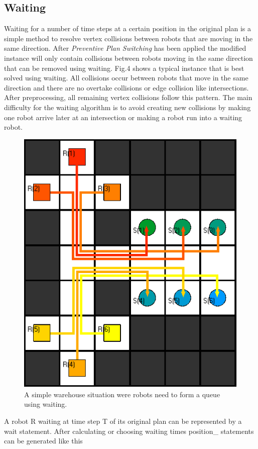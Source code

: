 \documentclass{llncs}
\begin{document}
\subsection{Waiting}
Waiting for a number of time steps at a certain position in the original plan is a simple method to resolve vertex collisions between robots that are moving in the same direction. After \emph{Preventive Plan Switching} has been applied the modified instance will only contain collisions between robots moving in the same direction that can be removed using waiting. 
Fig.4 shows a typical instance that is best solved using waiting. All collisions occur between robots that move in the same direction and there are no overtake collisions or edge collision like intersections.
After preprocessing, all remaining vertex collisions follow this pattern. The main difficulty for the waiting algorithm is to avoid creating new collisions by making one robot arrive later at an intersection or making a robot run into a waiting robot.
\begin{figure}
    \centering
    \includegraphics[scale=0.5]{images/bm_plans/bm_8_plans.png}
    \caption{A simple warehouse situation were robots need to form a queue using waiting.}
    \label{fig:my_label}
\end{figure}
A robot R waiting at time step T of its original plan can be represented by a wait statement. After calculating or choosing waiting times position\_ statements can be generated like this
\end{document}
